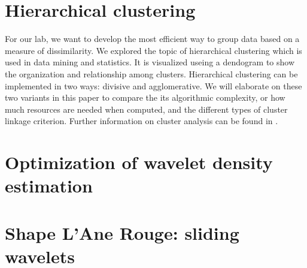\documentclass{article}
\begin{document}

  
  
  
  

\part{Hierarchical clustering}

  For our lab, we want to develop the most efficient way to group data
  based on a measure of dissimilarity. We explored the topic of
  hierarchical clustering which is used in data mining and statistics.
  It is visualized useing a dendogram to show the organization and relationship
  among clusters. Hierarchical clustering can be implemented in two
  ways: divisive and agglomerative. We will elaborate on these two variants
  in this paper to compare the its algorithmic complexity, or how much
  resources are needed when computed, and the different types of cluster
  linkage criterion. Further information on cluster analysis can be
  found in \cite{ClusterAnalysis}.

  
  
  

\part{Optimization of wavelet density estimation}
  

\part{Shape L'Ane Rouge: sliding wavelets}
  
  

\newpage


\end{document}
